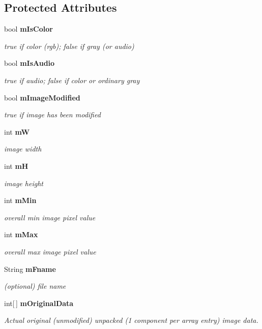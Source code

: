 \subsection*{Protected Attributes}
\begin{CompactItemize}
\item 
bool {\bf m\-Is\-Color}
\begin{CompactList}\small\item\em true if color (rgb); false if gray (or audio) \item\end{CompactList}\item 
bool {\bf m\-Is\-Audio}
\begin{CompactList}\small\item\em true if audio; false if color or ordinary gray \item\end{CompactList}\item 
bool {\bf m\-Image\-Modified}
\begin{CompactList}\small\item\em true if image has been modified \item\end{CompactList}\item 
int {\bf m\-W}
\begin{CompactList}\small\item\em image width \item\end{CompactList}\item 
int {\bf m\-H}
\begin{CompactList}\small\item\em image height \item\end{CompactList}\item 
int {\bf m\-Min}
\begin{CompactList}\small\item\em overall min image pixel value \item\end{CompactList}\item 
int {\bf m\-Max}
\begin{CompactList}\small\item\em overall max image pixel value \item\end{CompactList}\item 
String {\bf m\-Fname}
\begin{CompactList}\small\item\em (optional) file name \item\end{CompactList}\item 
int[$\,$] {\bf m\-Original\-Data}
\begin{CompactList}\small\item\em Actual original (unmodified) unpacked (1 component per array entry) image data. \item\end{CompactList}\end{CompactItemize}


